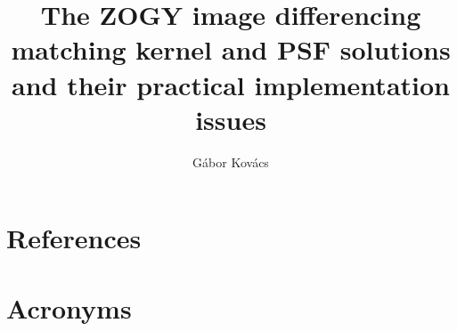 \documentclass[DM,authoryear,toc]{lsstdoc}
\title{The ZOGY image differencing matching kernel and PSF solutions
  and their practical implementation issues}
\author{%
G\'abor Kov\'acs
}
\date{\vcsDate}
\begin{document}
\maketitle


\appendix

\section{References} \label{sec:bib}
\renewcommand{\refname}{} %


\section{Acronyms} \label{sec:acronyms}

\end{document}
